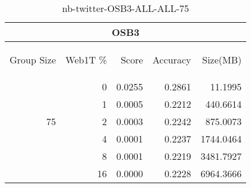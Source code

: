 \begin{center}
\begin{table}[htbp]
\begin{tabular}{ | r | r | r | r | r |}
\hline
\multicolumn{5}{|c|}{OSB3}\\
\hline
\begin{sideways}Group Size\end{sideways} & \begin{sideways}Web1T \%\end{sideways} & \begin{sideways}Score\end{sideways} & \begin{sideways}Accuracy\end{sideways} & \begin{sideways}Size(MB)\end{sideways}\\
\hline
\multirow{5}{*}{75}
 & 0 & 0.0255 & 0.2861 & 11.1995\\ \cline{2-5}
 & 1 & 0.0005 & 0.2212 & 440.6614\\ \cline{2-5}
 & 2 & 0.0003 & 0.2242 & 875.0073\\ \cline{2-5}
 & 4 & 0.0001 & 0.2237 & 1744.0464\\ \cline{2-5}
 & 8 & 0.0001 & 0.2219 & 3481.7927\\ \cline{2-5}
 & 16 & 0.0000 & 0.2228 & 6964.3666\\ \cline{2-5}
\hline
\end{tabular}
\caption{nb-twitter-OSB3-ALL-ALL-75}
\label{table:nb-twitter-OSB3-ALL-ALL-75}
\end{table}
\end{center}

